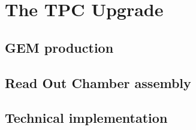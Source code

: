\chapter{The TPC Upgrade}
\section{GEM production}
\section{Read Out Chamber assembly}
\section{Technical implementation}